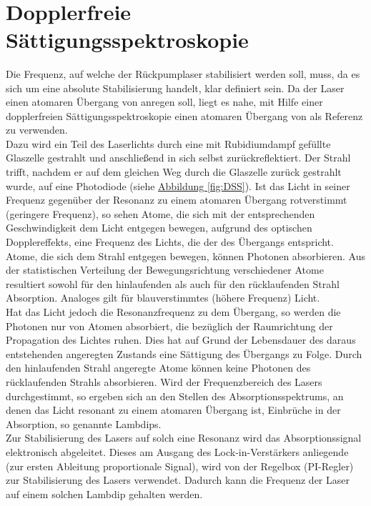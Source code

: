 \documentclass[
class=book,
accentcolor=1b,
custommargins=geometry,
fontsize=11pt,
thesis={type=Versuchsanleitung},
ruledheaders=all,
headline=false,
instbox=false,
marginpar=false,
title=small,
ignore-missing-data=true,
twoside=false,
logofile=apqdesign/tuda_logo.pdf,
pdfa=false %
]{apqpub}
\newtheorem{frage}[satz]{Frage}
\newcommand{\gqq}[1]{\glqq{}#1\grqq{}}
\begin{document}
			\\
				
				\section{Dopplerfreie Sättigungsspektroskopie}			
				Die Frequenz, auf welche der Rückpumplaser stabilisiert werden soll, muss, da es sich um eine absolute Stabilisierung handelt, klar definiert sein. 
				Da der Laser einen atomaren Übergang von  anregen soll, liegt es nahe, mit Hilfe einer dopplerfreien Sättigungsspektroskopie einen atomaren Übergang von  als Referenz zu verwenden.\\
				Dazu wird ein Teil des Laserlichts durch eine mit Rubidiumdampf gefüllte Glaszelle gestrahlt und anschließend in sich selbst zurückreflektiert. 
				Der Strahl trifft, nachdem er auf dem gleichen Weg durch die Glaszelle zurück gestrahlt wurde, auf eine Photodiode (siehe \hyperref[fig:DSS]{Abbildung \ref{fig:DSS}}). 
				Ist das Licht in seiner Frequenz gegenüber der Resonanz zu einem atomaren Übergang rotverstimmt (geringere Frequenz), so \gqq{sehen} Atome, die sich mit der entsprechenden Geschwindigkeit dem Licht entgegen bewegen, aufgrund des optischen Dopplereffekts, eine Frequenz des Lichts, die der des Übergangs entspricht. 
				Atome, die sich dem Strahl entgegen bewegen, können Photonen absorbieren. 
				Aus der statistischen Verteilung der Bewegungsrichtung verschiedener Atome resultiert sowohl für den hinlaufenden als auch für den rücklaufenden Strahl Absorption. 
				Analoges gilt für blauverstimmtes (höhere Frequenz) Licht.\\
				Hat das Licht jedoch die Resonanzfrequenz zu dem Übergang, so werden die Photonen nur von Atomen absorbiert, die bezüglich der Raumrichtung der Propagation des Lichtes ruhen. 
				Dies hat auf Grund der Lebensdauer des daraus entstehenden angeregten Zustands eine Sättigung des Übergangs zu Folge. 
				Durch den hinlaufenden Strahl angeregte Atome können keine Photonen des rücklaufenden Strahls absorbieren. 
				Wird der Frequenzbereich des Lasers durchgestimmt, so ergeben sich an den Stellen des Absorptionsspektrums, an denen das Licht resonant zu einem atomaren Übergang ist, Einbrüche in der Absorption, so genannte \gqq{Lambdips}.\\
				Zur Stabilisierung des Lasers auf solch eine Resonanz wird das Absorptionssignal elektronisch abgeleitet. 
				Dieses am Ausgang des Lock-in-Verstärkers anliegende (zur ersten Ableitung proportionale Signal), wird von der Regelbox (PI-Regler) zur Stabilisierung des Lasers verwendet. 
				Dadurch kann die Frequenz der Laser auf einem solchen Lambdip \gqq{gehalten} werden.\\
				
\end{document}
